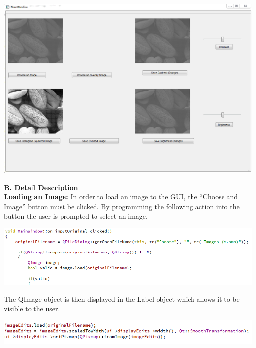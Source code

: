 \documentclass{article}
\newenvironment{Figure}
  {\par\medskip\noindent\ignorespaces\minipage{\linewidth}}
  {\endminipage\par\medskip}
\begin{document}
\begin{multicols*}{2}
\begin{Figure}
 \centering
 \includegraphics[width=\linewidth]{GUI.png}
\end{Figure}

{\bf B. Detail Description}\\

{\bf Loading an Image:}  
In order to load an image to the GUI, the “Choose and Image” button must be clicked. By programming the following action into the button the user is prompted to select an image.


\begin{Figure}
 \centering
 \includegraphics[width=\linewidth]{inputimage.png}
\end{Figure}


The QImage object is then displayed in the Label object which allows it to be visible to the user.


\begin{Figure}
 \centering
 \includegraphics[width=\linewidth]{labelDisplay.png}
\end{Figure}




\end{multicols*}
\end{document}
